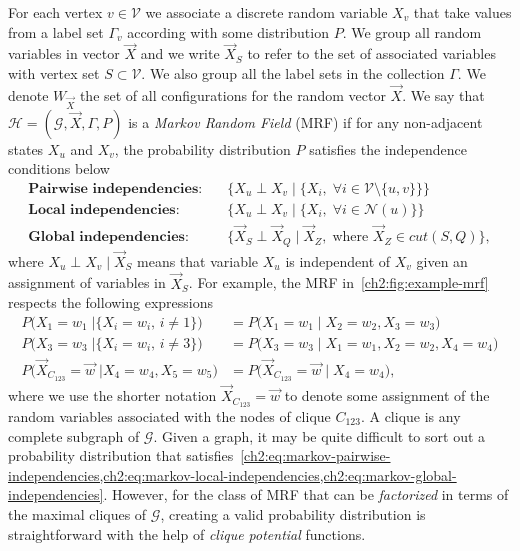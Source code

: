 For each vertex $v \in \mathcal{V}$ we associate a discrete random variable $X_v$ that take values from a label set $\Gamma_v$ according with some distribution $P$. We group all random variables in vector $\vec{X}$ and we write $\vec{X}_S$ to refer to the set of associated variables with vertex set $S \subset \mathcal{V}$. We also group all the label sets in the collection $\Gamma$. We denote $W_{\vec{X}}$ the set of all configurations for the random vector $\vec{X}$. We say that $\mathcal{H} =(\mathcal{G},\vec{X},\Gamma,P)$ is a \emph{Markov Random Field} (MRF) if for any non-adjacent states $X_u$ and $X_v$, the probability distribution $P$  satisfies the independence conditions below
\begin{align}
	\textbf{Pairwise independencies:}&\quad \Big\{ X_u \perp X_v \;|\; \big\{X_i,\; \forall i \in \mathcal{V}\setminus\{u,v\} \big\}  \Big\} \label{ch2:eq:markov-pairwise-independencies}   \\
	\textbf{Local independencies:}&\quad \Big\{ X_u \perp X_v \;|\; \big\{X_i, \; \forall i \in \mathcal{N}(u)  \big\} \Big\} \label{ch2:eq:markov-local-independencies} \\
	\textbf{Global independencies:}& \quad \Big\{ \vec{X}_S \perp \vec{X}_Q \;|\; \vec{X}_Z,\; \text{where } \vec{X}_Z \in cut(S,Q) \Big\} \label{ch2:eq:markov-global-independencies},
\end{align}
%
where $X_u  \perp  X_v \;|\; \vec{X}_S$ means that variable $X_u$ is independent of $X_v$ given an assignment of variables in $\vec{X}_S$.  For example, the MRF in~\cref{ch2:fig:example-mrf} respects the following expressions 
\begin{align*}
		P\Big(X_1=w_1 \; | \big\{X_i=w_i, \, i \neq 1 \big\} \Big) &= P\Big(X_1=w_1 \; | \; X_2=w_2,X_3=w_3 \Big) \\
		P\Big(X_3=w_3 \; | \big\{X_i=w_i, \, i \neq 3 \big\} \Big) &= P\Big(X_3=w_3 \; | \; X_1=w_1,X_2=w_2, X_4=w_4 \Big) \\
		P\Big(\vec{X}_{C_{123}} = \vec{w} \; | X_4=w_4, X_5=w_5  \Big) &= P\Big(\vec{X}_{C_{123}} = \vec{w} \; | \; X_4=w_4 \Big),		
\end{align*}
%
where we use the shorter notation $\vec{X}_{C_{123}} = \vec{w} $ to denote some assignment of the random variables associated with the nodes of clique $C_{123}$. A clique is any complete subgraph of $\mathcal{G}$. Given a graph, it may be quite difficult to sort out a probability distribution that satisfies~\cref{ch2:eq:markov-pairwise-independencies,ch2:eq:markov-local-independencies,ch2:eq:markov-global-independencies}. However, for the class of MRF that can be \emph{factorized} in terms of the maximal cliques of $\mathcal{G}$, creating a valid probability distribution is straightforward with the help of \emph{clique potential} functions.

